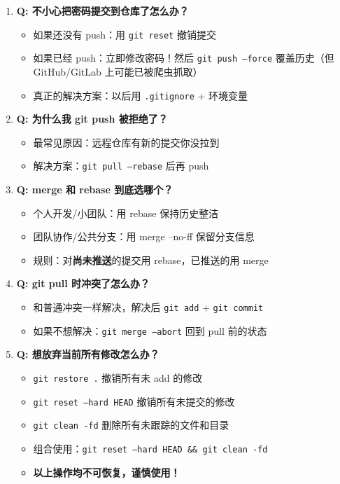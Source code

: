 \documentclass[12pt,a4paper]{article}
\begin{document}
\begin{enumerate}[itemsep=10pt]

    \item \textbf{Q: 不小心把密码提交到仓库了怎么办？}
    \begin{itemize}
        \item 如果还没有 push：用 \texttt{git reset} 撤销提交
        \item 如果已经 push：立即修改密码！然后 \texttt{git push --force} 覆盖历史（但 GitHub/GitLab 上可能已被爬虫抓取）
        \item 真正的解决方案：以后用 \texttt{.gitignore} + 环境变量
    \end{itemize}

    \item \textbf{Q: 为什么我 git push 被拒绝了？}
    \begin{itemize}
        \item 最常见原因：远程仓库有新的提交你没拉到
        \item 解决方案：\texttt{git pull --rebase} 后再 push
    \end{itemize}

    \item \textbf{Q: merge 和 rebase 到底选哪个？}
    \begin{itemize}
        \item 个人开发/小团队：用 rebase 保持历史整洁
        \item 团队协作/公共分支：用 merge --no-ff 保留分支信息
        \item 规则：对\textbf{尚未推送}的提交用 rebase，已推送的用 merge
    \end{itemize}

    \item \textbf{Q: git pull 时冲突了怎么办？}
    \begin{itemize}
        \item 和普通冲突一样解决，解决后 \texttt{git add} + \texttt{git commit}
        \item 如果不想解决：\texttt{git merge --abort} 回到 pull 前的状态
    \end{itemize}

    \item \textbf{Q: 想放弃当前所有修改怎么办？}
    \begin{itemize}
        \item \texttt{git restore .} 撤销所有未 add 的修改
        \item \texttt{git reset --hard HEAD} 撤销所有未提交的修改
        \item \texttt{git clean -fd} 删除所有未跟踪的文件和目录
        \item 组合使用：\texttt{git reset --hard HEAD \&\& git clean -fd}
        \item \textbf{以上操作均不可恢复，谨慎使用！}
    \end{itemize}


\end{enumerate}
\end{document}
